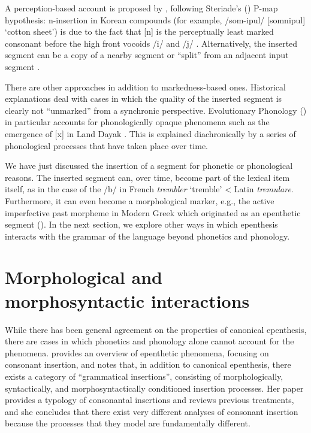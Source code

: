 \documentclass[output=paper,colorlinks,citecolor=brown]{langscibook}
\begin{document}
A perception-based account is proposed by \citet{Jun2015, Jun2021}, following Steriade’s (\citeyear{Steriade2001, Steriade2009}) P-map hypothesis: n-insertion in Korean compounds (for example, /som-ipul/ [somnipul] ‘cotton sheet’) is due to the fact that [n] is the perceptually least marked consonant before the high front vocoids /i/ and /j/ \citep[34]{Jun2021}. Alternatively, the inserted segment can be a copy of a nearby segment \citep{KittoLacy1999} or “split” from an adjacent input segment \citep{Staroverov2014}.

There are other approaches in addition to markedness-based ones. Historical explanations deal with cases in which the quality of the inserted segment is clearly not “unmarked” from a synchronic perspective. Evolutionary Phonology (\citealt{Blevins2004,Blevins2008}) in particular accounts for phonologically opaque phenomena such as the emergence of [x] in Land Dayak \citep{Blevins2008}. This is explained diachronically by a series of phonological processes that have taken place over time.

We have just discussed the insertion of a segment for phonetic or phonological reasons. The inserted segment can, over time, become part of the lexical item itself, as in the case of the /b/ in French \textit{trembler} ‘tremble’ < Latin \textit{tremulare}. Furthermore, it can even become a morphological marker, e.g., the active imperfective past morpheme in Modern Greek which originated as an epenthetic segment (\citealt{JosephRalli2021}). In the next section, we explore other ways in which epenthesis interacts with the grammar of the language beyond phonetics and phonology.

\section{Morphological and morphosyntactic interactions} \label{morph}
While there has been general agreement on the properties of canonical epenthesis, there are cases in which phonetics and phonology alone cannot account for the phenomena. \citet{Żygis2010} provides an overview of epenthetic phenomena, focusing on consonant insertion, and notes that, in addition to canonical epenthesis, there exists a category of “grammatical insertions”, consisting of morphologically, syntactically, and morphosyntactically conditioned insertion processes. Her paper provides a typology of consonantal insertions and reviews previous treatments, and she concludes that there exist very different analyses of consonant insertion because the processes that they model are fundamentally different. 
\end{document}
